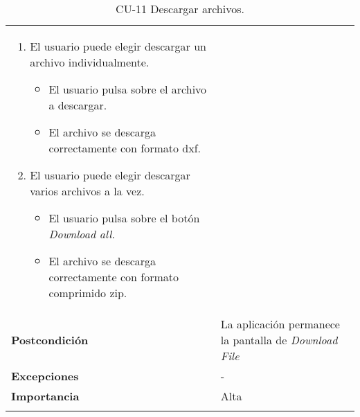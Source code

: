 \begin{longtable}[H]{@{}ll@{}}
\begin{minipage}[t]{0.71\columnwidth}
\begin{enumerate}
\def\labelenumi{\arabic{enumi}.}
\tightlist
\item
  El usuario puede elegir descargar un archivo individualmente.
\begin{itemize}
\tightlist
\item
  El usuario pulsa sobre el archivo a descargar. 
\item
  El archivo se descarga correctamente con formato dxf.
\end{itemize}
\item
  El usuario puede elegir descargar varios archivos a la vez.
\begin{itemize}
\tightlist
\item
  El usuario pulsa sobre el botón \emph{Download all}. 
\item
  El archivo se descarga correctamente con formato comprimido zip.
\end{itemize}
\end{enumerate}\strut
\end{minipage}\tabularnewline
\begin{minipage}[t]{0.23\columnwidth}\raggedright\strut
\textbf{Postcondición}\strut
\end{minipage} & \begin{minipage}[t]{0.71\columnwidth}\raggedright\strut
La aplicación permanece la pantalla de \emph{Download File}
\end{minipage}\tabularnewline
\begin{minipage}[t]{0.23\columnwidth}\raggedright\strut
\textbf{Excepciones}\strut
\end{minipage} & \begin{minipage}[t]{0.71\columnwidth}\raggedright\strut
-\strut
\end{minipage}\tabularnewline
\begin{minipage}[t]{0.23\columnwidth}\raggedright\strut
\textbf{Importancia}\strut
\end{minipage} & \begin{minipage}[t]{0.71\columnwidth}\raggedright\strut
Alta\strut
\end{minipage}\tabularnewline
\bottomrule
\caption{CU-11 Descargar archivos.}
\end{longtable}
\strut



